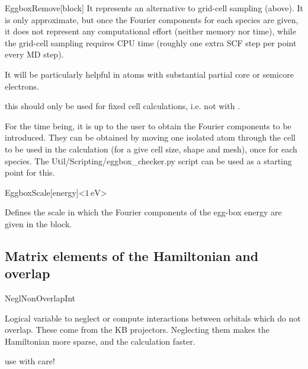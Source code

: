 \begin{fdfentry}{EggboxRemove}[block]
  It represents an alternative to grid-cell sampling (above).  It is
  only approximate, but once the Fourier components for each species
  are given, it does not represent any computational effort (neither
  memory nor time), while the grid-cell sampling requires CPU time
  (roughly one extra SCF step per point every MD step).

  It will be particularly helpful in atoms with substantial partial
  core or semicore electrons.

  \note this should only be used for fixed cell calculations, i.e. not
  with .

  For the time being, it is up to the user to obtain the Fourier
  components to be introduced. They can be obtained by moving one
  isolated atom through the cell to be used in the calculation (for a
  give cell size, shape and mesh), once for each species.  The
  Util/Scripting/eggbox\_checker.py script can be used as a starting
  point for this.

\end{fdfentry}

\begin{fdfentry}{EggboxScale}[energy]<$1\,\mathrm{eV}$>

  Defines the scale in which the Fourier components of the egg-box
  energy are given in the  block.

\end{fdfentry}

\subsection{Matrix elements of the Hamiltonian and overlap}


\begin{fdflogicalF}{NeglNonOverlapInt}
  
  Logical variable to neglect or compute interactions between orbitals
  which do not overlap. These come from the KB projectors.  Neglecting
  them makes the Hamiltonian more sparse, and the calculation faster.
  
  \note use with care!

\end{fdflogicalF}

